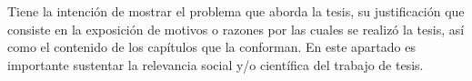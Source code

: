 Tiene la intención de mostrar el problema que aborda la tesis, su justificación que consiste en la exposición de motivos o razones por las cuales se realizó la tesis, así como el contenido de los capítulos que la conforman. En este apartado es importante sustentar la relevancia social y/o científica del trabajo de tesis.